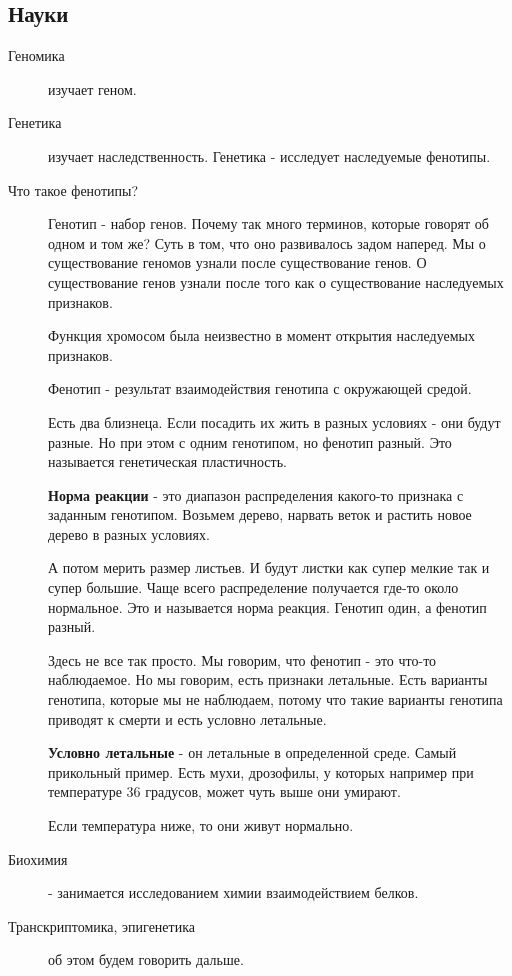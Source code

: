 \subsection{Науки}
\begin{description}
\item[Геномика] изучает геном.  
\item[Генетика] изучает наследственность.
Генетика - исследует наследуемые фенотипы.

\item[Что такое фенотипы?] 
Генотип - набор генов. 
Почему так много терминов, которые говорят об одном и том же? 
Суть в том, что оно развивалось задом наперед. Мы о существование 
геномов узнали после существование генов. О существование генов 
узнали после того как о существование наследуемых признаков. 

Функция хромосом была неизвестно в момент открытия наследуемых 
признаков. 

Фенотип - результат взаимодействия генотипа с окружающей средой. 

Есть два близнеца. Если посадить их жить в разных 
условиях - они будут разные. Но при этом с одним генотипом, 
но фенотип разный. Это называется 
генетическая пластичность. 

\textbf{Норма реакции} - это диапазон распределения какого-то признака 
с заданным генотипом. Возьмем дерево, нарвать веток и 
растить новое дерево в разных условиях. 

А потом мерить размер листьев. И будут листки как супер мелкие 
так и супер большие. Чаще всего распределение получается 
где-то около нормальное. Это и называется норма реакция. Генотип один, 
а фенотип разный. 

Здесь не все так просто. Мы говорим, что фенотип - это что-то наблюдаемое. 
Но мы говорим, есть признаки летальные. Есть 
варианты генотипа, которые мы не наблюдаем, потому что 
такие варианты генотипа приводят к смерти и есть условно летальные. 

\textbf{Условно летальные} - он летальные в определенной среде. Самый 
прикольный пример. Есть мухи, дрозофилы, у которых например 
при температуре 36 градусов, может чуть выше они умирают. 

Если температура ниже, то они живут нормально. 

\item[Биохимия] - занимается исследованием химии взаимодействием белков. 

\item[Транскриптомика, эпигенетика] об этом будем говорить дальше. 
\end{description} 

